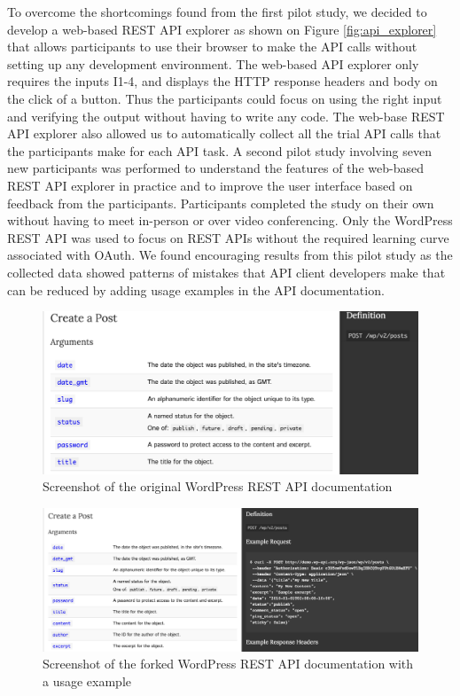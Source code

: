 \documentclass[conference]{IEEEtran}
\begin{document}
To overcome the shortcomings found from the first pilot study, we decided to develop a web-based REST API explorer as shown on Figure \ref{fig:api_explorer} that allows participants to use their browser to make the API calls without setting up any development environment. The web-based API explorer only requires the inputs I1-4, and displays the HTTP response headers and body on the click of a button. Thus the participants could focus on using the right input and verifying the output without having to write any code. The web-base REST API explorer also allowed us to automatically collect all the trial API calls that the participants make for each API task. A second pilot study involving seven new participants was performed to understand the features of the web-based REST API explorer in practice and to improve the user interface based on feedback from the participants. Participants completed the study on their own without having to meet in-person or over video conferencing. Only the WordPress REST API was used to focus on REST APIs without the required learning curve associated with OAuth. We found encouraging results from this pilot study as the collected data showed patterns of mistakes that API client developers make that can be reduced by adding usage examples in the API documentation.


\begin{figure}[t]
\begin{center}
\includegraphics[width=\linewidth,keepaspectratio]{original.png}
\end{center}
\caption{Screenshot of the original WordPress REST API documentation}
\label{fig:original}
\end{figure}

\begin{figure}[tb]
\begin{center}
\includegraphics[width=\linewidth,keepaspectratio]{forked.png}
\end{center}
\caption{Screenshot of the forked WordPress REST API documentation with a usage example}
\label{fig:forked}
\end{figure}
\end{document}
